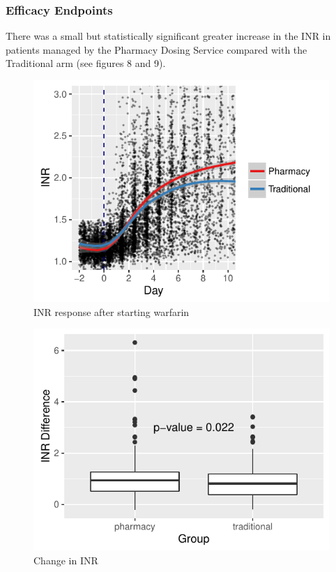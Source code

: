 \documentclass[]{article}
\begin{document}
\subsubsection{Efficacy Endpoints}\label{efficacy-endpoints}

There was a small but statistically significant greater increase in the
INR in patients managed by the Pharmacy Dosing Service compared with the
Traditional arm (see figures 8 and 9).

\begin{figure}[H]
\centering
\includegraphics{warfarin_analysis_2015_files/figure-latex/inr-1.pdf}
\caption{INR response after starting warfarin}
\end{figure}

\begin{figure}[H]
\centering
\includegraphics{warfarin_analysis_2015_files/figure-latex/inr2-1.pdf}
\caption{Change in INR}
\end{figure}
\end{document}

